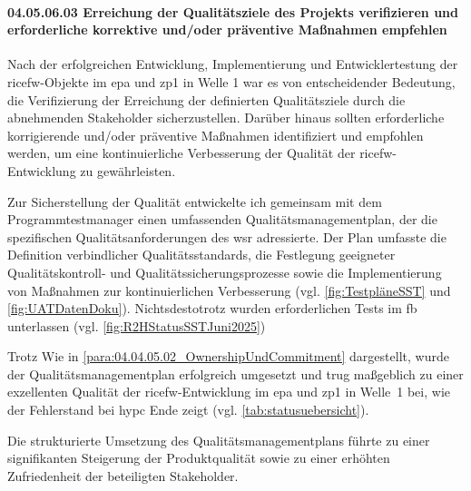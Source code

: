 \paragraph*{04.05.06.03 Erreichung der Qualitätsziele des Projekts verifizieren und erforderliche korrektive
und/oder präventive Maßnahmen empfehlen}
\label{para:04.05.06.03_ErreichungDerQualitätsziele}

\par Nach der erfolgreichen Entwicklung, Implementierung und Entwicklertestung der \gls{ricefw}-Objekte im \gls{epa} und \gls{zp1} in Welle 1 war es von entscheidender Bedeutung, die Verifizierung der Erreichung der definierten Qualitätsziele durch die abnehmenden Stakeholder sicherzustellen. Darüber hinaus sollten erforderliche korrigierende und/oder präventive Maßnahmen identifiziert und empfohlen werden, um eine kontinuierliche Verbesserung der Qualität der \gls{ricefw}-Entwicklung zu gewährleisten.

\par Zur Sicherstellung der Qualität entwickelte ich gemeinsam mit dem Programmtestmanager einen umfassenden Qualitätsmanagementplan, der die spezifischen Qualitätsanforderungen des \gls{wsr} adressierte. Der Plan umfasste die Definition verbindlicher Qualitätsstandards, die Festlegung geeigneter Qualitätskontroll- und Qualitätssicherungsprozesse sowie die Implementierung von Maßnahmen zur kontinuierlichen Verbesserung (vgl. \autoref{fig:TestpläneSST} und \autoref{fig:UATDatenDoku}). Nichtsdestotrotz wurden erforderlichen Tests im \gls{fb} unterlassen (vgl. \autoref{fig:R2HStatusSSTJuni2025})

\par Trotz Wie in \autoref{para:04.04.05.02_OwnershipUndCommitment} dargestellt, wurde der Qualitätsmanagementplan erfolgreich umgesetzt und trug maßgeblich zu einer exzellenten Qualität der \gls{ricefw}-Entwicklung im \gls{epa} und \gls{zp1} in Welle~1 bei, wie der Fehlerstand bei \gls{hypc} Ende zeigt (vgl. \autoref{tab:statusuebersicht}).

\par  Die strukturierte Umsetzung des Qualitätsmanagementplans führte zu einer signifikanten Steigerung der Produktqualität sowie zu einer erhöhten Zufriedenheit der beteiligten Stakeholder.